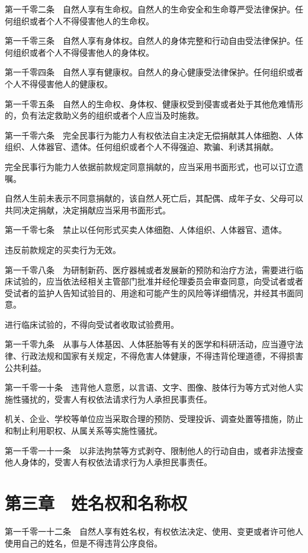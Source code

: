 \documentclass[UTF8,12pt,a4paper]{ctexbook}
\begin{document}
第一千零二条　自然人享有生命权。自然人的生命安全和生命尊严受法律保护。任何组织或者个人不得侵害他人的生命权。

第一千零三条　自然人享有身体权。自然人的身体完整和行动自由受法律保护。任何组织或者个人不得侵害他人的身体权。

第一千零四条　自然人享有健康权。自然人的身心健康受法律保护。任何组织或者个人不得侵害他人的健康权。

第一千零五条　自然人的生命权、身体权、健康权受到侵害或者处于其他危难情形的，负有法定救助义务的组织或者个人应当及时施救。

第一千零六条　完全民事行为能力人有权依法自主决定无偿捐献其人体细胞、人体组织、人体器官、遗体。任何组织或者个人不得强迫、欺骗、利诱其捐献。

完全民事行为能力人依据前款规定同意捐献的，应当采用书面形式，也可以订立遗嘱。

自然人生前未表示不同意捐献的，该自然人死亡后，其配偶、成年子女、父母可以共同决定捐献，决定捐献应当采用书面形式。

第一千零七条　禁止以任何形式买卖人体细胞、人体组织、人体器官、遗体。

违反前款规定的买卖行为无效。

第一千零八条　为研制新药、医疗器械或者发展新的预防和治疗方法，需要进行临床试验的，应当依法经相关主管部门批准并经伦理委员会审查同意，向受试者或者受试者的监护人告知试验目的、用途和可能产生的风险等详细情况，并经其书面同意。

进行临床试验的，不得向受试者收取试验费用。

第一千零九条　从事与人体基因、人体胚胎等有关的医学和科研活动，应当遵守法律、行政法规和国家有关规定，不得危害人体健康，不得违背伦理道德，不得损害公共利益。

第一千零一十条　违背他人意愿，以言语、文字、图像、肢体行为等方式对他人实施性骚扰的，受害人有权依法请求行为人承担民事责任。

机关、企业、学校等单位应当采取合理的预防、受理投诉、调查处置等措施，防止和制止利用职权、从属关系等实施性骚扰。

第一千零一十一条　以非法拘禁等方式剥夺、限制他人的行动自由，或者非法搜查他人身体的，受害人有权依法请求行为人承担民事责任。

\section*{第三章　姓名权和名称权}

第一千零一十二条　自然人享有姓名权，有权依法决定、使用、变更或者许可他人使用自己的姓名，但是不得违背公序良俗。
\end{document}
